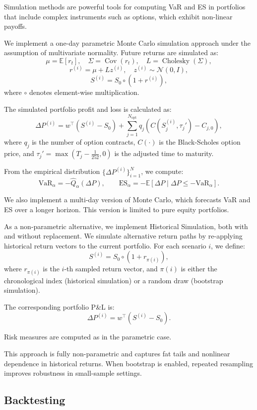\documentclass{article}
\begin{document}
Simulation methods are powerful tools for computing VaR and ES in portfolios that include complex instruments such as options, which exhibit non-linear payoffs.

We implement a one-day parametric Monte Carlo simulation approach under the assumption of multivariate normality. Future returns are simulated as:
\[
\mu = \mathbb{E}[r_t], \quad \Sigma = \operatorname{Cov}(r_t), \quad L = \operatorname{Cholesky}(\Sigma),
\]
\[
r^{(i)} = \mu + L z^{(i)}, \quad z^{(i)} \sim \mathcal{N}(0, I),
\]
\[
S^{(i)} = S_0 \circ (1 + r^{(i)}),
\]
where \( \circ \) denotes element-wise multiplication.

The simulated portfolio profit and loss is calculated as:
\[
\Delta P^{(i)} = w^\top(S^{(i)} - S_0) + \sum_{j=1}^{N_{\mathrm{opt}}} q_j \left(C(S_j^{(i)}, \tau_j') - C_{j,0}\right),
\]
where \( q_j \) is the number of option contracts, \( C(\cdot) \) is the Black-Scholes option price, and \( \tau_j' = \max(T_j - \tfrac{1}{252}, 0) \) is the adjusted time to maturity.

From the empirical distribution \( \{\Delta P^{(i)}\}_{i=1}^N \), we compute:
\[
\text{VaR}_\alpha = -\widehat{Q}_\alpha(\Delta P), \qquad
\text{ES}_\alpha = -\mathbb{E}[\Delta P \mid \Delta P \le -\text{VaR}_\alpha].
\]

We also implement a multi-day version of Monte Carlo, which forecasts VaR and ES over a longer horizon. This version is limited to pure equity portfolios.

As a non-parametric alternative, we implement Historical Simulation, both with and without replacement. We simulate alternative return paths by re-applying historical return vectors to the current portfolio. For each scenario \( i \), we define:
\[
S^{(i)} = S_0 \circ (1 + r_{\pi(i)}),
\]
where \( r_{\pi(i)} \) is the \( i \)-th sampled return vector, and \( \pi(i) \) is either the chronological index (historical simulation) or a random draw (bootstrap simulation).

The corresponding portfolio P\&L is:
\[
\Delta P^{(i)} = w^\top (S^{(i)} - S_0).
\]

Risk measures are computed as in the parametric case.

This approach is fully non-parametric and captures fat tails and nonlinear dependence in historical returns. When bootstrap is enabled, repeated resampling improves robustness in small-sample settings.


\subsection{Backtesting}
\end{document}
